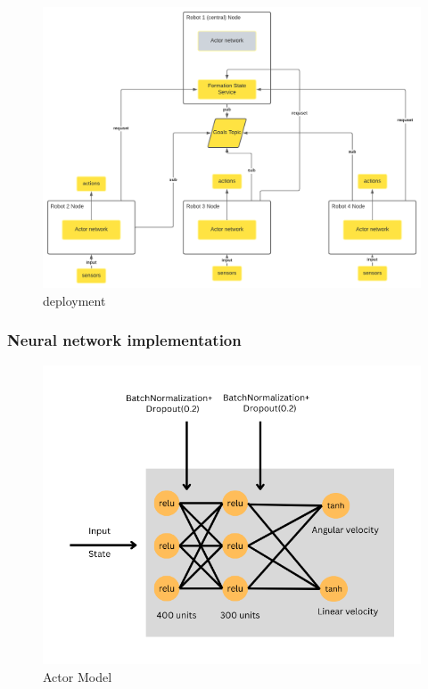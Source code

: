 \documentclass[12pt]{extarticle}
\begin{document}
 \begin{figure}[H]  
\centering
\includegraphics[scale=1.2]{deployment}
\caption[deployment]{deployment}
\end{figure}













\subsubsection{Neural network implementation}

\begin{figure}[H]  
\centering
\includegraphics[scale=0.55]{actor_net}
\caption[Actor model]{Actor Model}
\label{fig:actor}
\end{figure}
\end{document}
